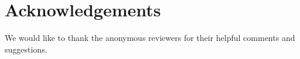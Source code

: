 \section{Acknowledgements}

We would like to thank the anonymous reviewers for their helpful comments and
suggestions.